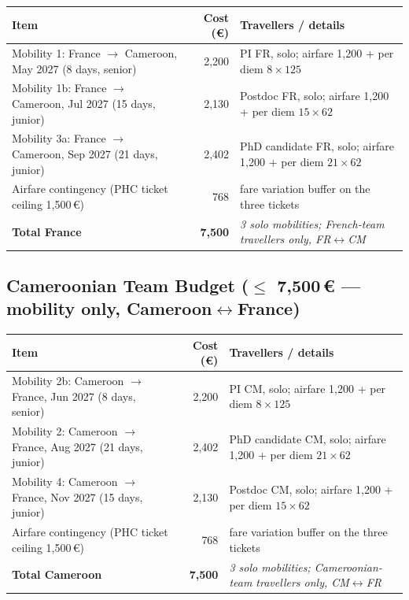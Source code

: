 \documentclass[11pt,a4paper]{article}
\begin{document}
\begin{table}[htbp]
\centering
\scriptsize
\begin{tabular}{lrl}
\toprule
\textbf{Item} & \textbf{Cost (€)} & \textbf{Travellers / details} \\
\midrule
Mobility 1: France $\rightarrow$ Cameroon, May 2027 (8 days, senior) & 2,200 & PI FR, solo; airfare 1,200 + per diem $8\times125$ \\
Mobility 1b: France $\rightarrow$ Cameroon, Jul 2027 (15 days, junior) & 2,130 & Postdoc FR, solo; airfare 1,200 + per diem $15\times62$ \\
Mobility 3a: France $\rightarrow$ Cameroon, Sep 2027 (21 days, junior) & 2,402 & PhD candidate FR, solo; airfare 1,200 + per diem $21\times62$ \\
Airfare contingency (PHC ticket ceiling 1,500\,€) & 768 & fare variation buffer on the three tickets \\
\midrule
\textbf{Total France} & \textbf{7,500} & \textit{3 solo mobilities; French-team travellers only, FR$\leftrightarrow$CM} \\
\bottomrule
\end{tabular}
\end{table}

\subsection{Cameroonian Team Budget ($\leq$ 7,500\,€ --- mobility only, Cameroon$\leftrightarrow$France)}

\begin{table}[htbp]
\centering
\scriptsize
\begin{tabular}{lrl}
\toprule
\textbf{Item} & \textbf{Cost (€)} & \textbf{Travellers / details} \\
\midrule
Mobility 2b: Cameroon $\rightarrow$ France, Jun 2027 (8 days, senior) & 2,200 & PI CM, solo; airfare 1,200 + per diem $8\times125$ \\
Mobility 2: Cameroon $\rightarrow$ France, Aug 2027 (21 days, junior) & 2,402 & PhD candidate CM, solo; airfare 1,200 + per diem $21\times62$ \\
Mobility 4: Cameroon $\rightarrow$ France, Nov 2027 (15 days, junior) & 2,130 & Postdoc CM, solo; airfare 1,200 + per diem $15\times62$ \\
Airfare contingency (PHC ticket ceiling 1,500\,€) & 768 & fare variation buffer on the three tickets \\
\midrule
\textbf{Total Cameroon} & \textbf{7,500} & \textit{3 solo mobilities; Cameroonian-team travellers only, CM$\leftrightarrow$FR} \\
\bottomrule
\end{tabular}
\end{table}
\end{document}
